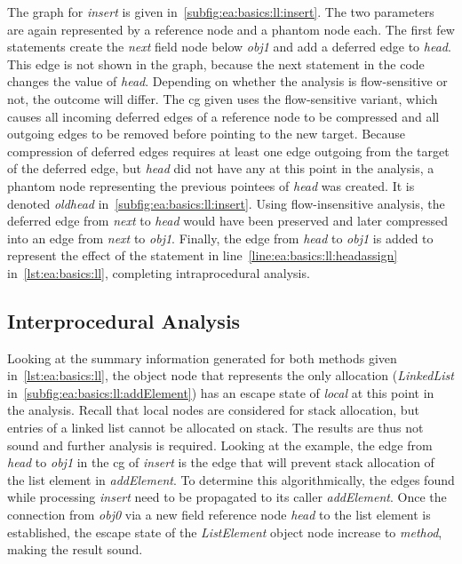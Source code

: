			The graph for \emph{insert} is given in~\cref{subfig:ea:basics:ll:insert}. The two parameters are again
			represented by a reference node and a phantom node each. The first few statements create the \emph{next} field
			node below \emph{obj1} and add a deferred edge to \emph{head}. This edge is not shown in the graph, because the
			next statement in the code changes the value of \emph{head}. Depending on whether the analysis is flow-sensitive
			or not, the outcome will differ. The \gls{cg} given uses the flow-sensitive variant, which causes all incoming
			deferred edges of a reference node to be compressed and all outgoing edges to be removed before pointing to the
			new target. Because compression of deferred edges requires at least one edge outgoing from the target of the
			deferred edge, but \emph{head} did not have any at this point in the analysis, a phantom node representing the
			previous pointees of \emph{head} was created. It is denoted \emph{oldhead} in~\cref{subfig:ea:basics:ll:insert}.
			Using flow-insensitive analysis, the deferred edge from \emph{next} to \emph{head} would have been preserved and
			later compressed into an edge from \emph{next} to \emph{obj1}. Finally, the edge from \emph{head} to \emph{obj1}
			is added to represent the effect of the statement in line~\ref{line:ea:basics:ll:headassign}
			in~\cref{lst:ea:basics:ll}, completing intraprocedural analysis.

		\subsection{Interprocedural Analysis}
			\label{sub:ea:basics:global}
			Looking at the summary information generated for both methods given in~\cref{lst:ea:basics:ll}, the object node
			that represents the only allocation (\emph{LinkedList} in~\cref{subfig:ea:basics:ll:addElement}) has an escape
			state of \emph{local} at this point in the analysis. Recall that local nodes are considered for stack allocation,
			but entries of a linked list cannot be allocated on stack. The results are thus not sound and further analysis is
			required. Looking at the example, the edge from \emph{head} to \emph{obj1} in the \gls{cg} of \emph{insert} is the
			edge that will prevent stack allocation of the list element in \emph{addElement}. To determine this
			algorithmically, the edges found while processing \emph{insert} need to be propagated to its caller
			\emph{addElement}. Once the connection from \emph{obj0} via a new field reference node \emph{head} to the list
			element is established, the escape state of the \emph{ListElement} object node increase to \emph{method}, making
			the result sound.

